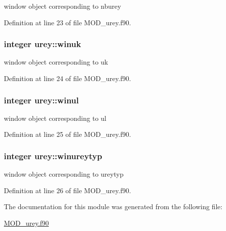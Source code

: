 window object corresponding to nburey 



Definition at line 23 of file M\-O\-D\-\_\-urey.\-f90.

\hypertarget{classurey_afac1bdac5167e22bc6e0bc1fbbca90c0}{
\subsubsection[{winuk}]{\setlength{\rightskip}{0pt plus 5cm}integer urey\-::winuk}}\label{classurey_afac1bdac5167e22bc6e0bc1fbbca90c0}


window object corresponding to uk 



Definition at line 24 of file M\-O\-D\-\_\-urey.\-f90.

\hypertarget{classurey_a3699f6c0c0f84cfdc816f511699961e3}{
\subsubsection[{winul}]{\setlength{\rightskip}{0pt plus 5cm}integer urey\-::winul}}\label{classurey_a3699f6c0c0f84cfdc816f511699961e3}


window object corresponding to ul 



Definition at line 25 of file M\-O\-D\-\_\-urey.\-f90.

\hypertarget{classurey_aa2711b5e01d4e98e57eefd8b8d3e2104}{
\subsubsection[{winureytyp}]{\setlength{\rightskip}{0pt plus 5cm}integer urey\-::winureytyp}}\label{classurey_aa2711b5e01d4e98e57eefd8b8d3e2104}


window object corresponding to ureytyp 



Definition at line 26 of file M\-O\-D\-\_\-urey.\-f90.



The documentation for this module was generated from the following file\-:\begin{DoxyCompactItemize}
\item 
\hyperlink{MOD__urey_8f90}{M\-O\-D\-\_\-urey.\-f90}\end{DoxyCompactItemize}
